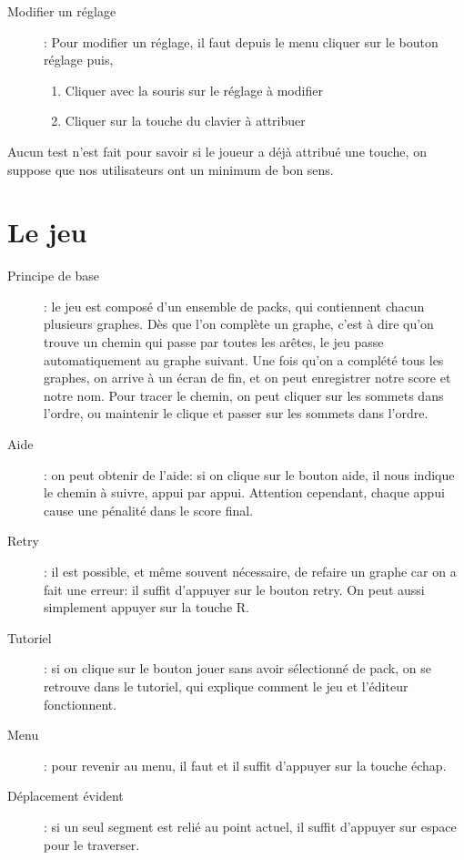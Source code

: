 \documentclass[12pt]{article}
\begin{document}
\begin{description}
    \item[Modifier un réglage] : Pour modifier un réglage, il faut depuis le menu cliquer sur le bouton réglage puis,
    \begin{enumerate}
        \item Cliquer avec la souris sur le réglage à modifier
        \item Cliquer sur la touche du clavier à attribuer
    \end{enumerate}
\end{description}

Aucun test n'est fait pour savoir si le joueur a déjà attribué une touche, on suppose que nos utilisateurs ont un minimum de bon sens.

\section{Le jeu}

\begin{description}
    \item[Principe de base]: le jeu est composé d'un ensemble de packs, qui contiennent chacun plusieurs graphes. Dès que l'on complète un graphe, c'est à dire qu'on trouve un chemin qui passe par toutes les arêtes, le jeu passe automatiquement au graphe suivant. Une fois qu'on a complété tous les graphes, on arrive à un écran de fin, et on peut enregistrer notre score et notre nom. Pour tracer le chemin, on peut cliquer sur les sommets dans l'ordre, ou maintenir le clique et passer sur les sommets dans l'ordre.

    \item[Aide]: on peut obtenir de l'aide: si on clique sur le bouton aide, il nous indique le chemin à suivre, appui par appui. Attention cependant, chaque appui cause une pénalité dans le score final.

    \item[Retry]: il est possible, et même souvent nécessaire, de refaire un graphe car on a fait une erreur: il suffit d'appuyer sur le bouton retry. On peut aussi simplement appuyer sur la touche R.

    \item[Tutoriel]: si on clique sur le bouton jouer sans avoir sélectionné de pack, on se retrouve dans le tutoriel, qui explique comment le jeu et l'éditeur fonctionnent.

    \item[Menu]: pour revenir au menu, il faut et il suffit d'appuyer sur la touche échap.

    \item[Déplacement évident]: si un seul segment est relié au point actuel, il suffit d'appuyer sur espace pour le traverser.
\end{description}
\end{document}
